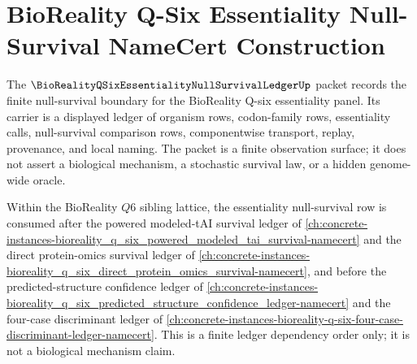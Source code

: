\chapter{BioReality Q-Six Essentiality Null-Survival NameCert Construction}
\label{ch:concrete-instances-bioreality_q_six_essentiality_null_survival-namecert}

The $\BioRealityQSixEssentialityNullSurvivalLedgerUp$ packet records the finite null-survival boundary for the BioReality Q-six essentiality panel. Its carrier is a displayed ledger of organism rows, codon-family rows, essentiality calls, null-survival comparison rows, componentwise transport, replay, provenance, and local naming. The packet is a finite observation surface; it does not assert a biological mechanism, a stochastic survival law, or a hidden genome-wide oracle.

Within the BioReality $Q6$ sibling lattice, the essentiality null-survival row is consumed after the powered modeled-tAI survival ledger of \autoref{ch:concrete-instances-bioreality_q_six_powered_modeled_tai_survival-namecert} and the direct protein-omics survival ledger of \autoref{ch:concrete-instances-bioreality_q_six_direct_protein_omics_survival-namecert}, and before the predicted-structure confidence ledger of \autoref{ch:concrete-instances-bioreality_q_six_predicted_structure_confidence_ledger-namecert} and the four-case discriminant ledger of \autoref{ch:concrete-instances-bioreality-q-six-four-case-discriminant-ledger-namecert}. This is a finite ledger dependency order only; it is not a biological mechanism claim.
